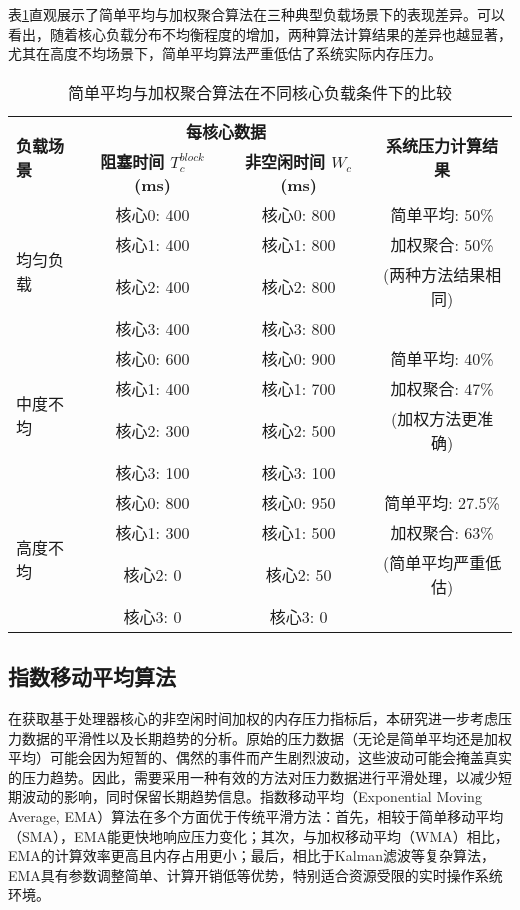 表\ref{tab:weighted_vs_simple}直观展示了简单平均与加权聚合算法在三种典型负载场景下的表现差异。可以看出，随着核心负载分布不均衡程度的增加，两种算法计算结果的差异也越显著，尤其在高度不均场景下，简单平均算法严重低估了系统实际内存压力。

\begin{table}[htbp]
    \centering
    \caption{简单平均与加权聚合算法在不同核心负载条件下的比较}
    \label{tab:weighted_vs_simple}
    \begin{tabular}{lccc}
        \toprule
        \multirow{2}{*}{\textbf{负载场景}} & \multicolumn{2}{c}{\textbf{每核心数据}} & \multirow{2}{*}{\textbf{系统压力计算结果}} \\
        \cmidrule(lr){2-3}
         & \textbf{阻塞时间 $T_c^{block}$ (ms)} & \textbf{非空闲时间 $W_c$ (ms)} & \\
        \midrule
        \multirow{4}{*}{均匀负载} & 核心0: 400 & 核心0: 800 & 简单平均: 50\% \\
         & 核心1: 400 & 核心1: 800 & 加权聚合: 50\% \\
         & 核心2: 400 & 核心2: 800 & (两种方法结果相同) \\
         & 核心3: 400 & 核心3: 800 & \\
        \midrule
        \multirow{4}{*}{中度不均} & 核心0: 600 & 核心0: 900 & 简单平均: 40\% \\
         & 核心1: 400 & 核心1: 700 & 加权聚合: 47\% \\
         & 核心2: 300 & 核心2: 500 & (加权方法更准确) \\
         & 核心3: 100 & 核心3: 100 & \\
        \midrule
        \multirow{4}{*}{高度不均} & 核心0: 800 & 核心0: 950 & 简单平均: 27.5\% \\
         & 核心1: 300 & 核心1: 500 & 加权聚合: 63\% \\
         & 核心2: 0 & 核心2: 50 & (简单平均严重低估) \\
         & 核心3: 0 & 核心3: 0 & \\
        \bottomrule
    \end{tabular}
\end{table}


\subsection{指数移动平均算法}
\label{sec:exponential_smoothing}
在获取基于处理器核心的非空闲时间加权的内存压力指标后，本研究进一步考虑压力数据的平滑性以及长期趋势的分析。原始的压力数据（无论是简单平均还是加权平均）可能会因为短暂的、偶然的事件而产生剧烈波动，这些波动可能会掩盖真实的压力趋势。因此，需要采用一种有效的方法对压力数据进行平滑处理，以减少短期波动的影响，同时保留长期趋势信息。指数移动平均（Exponential Moving Average, EMA）算法在多个方面优于传统平滑方法：首先，相较于简单移动平均（SMA），EMA能更快地响应压力变化；其次，与加权移动平均（WMA）相比，EMA的计算效率更高且内存占用更小；最后，相比于Kalman滤波等复杂算法，EMA具有参数调整简单、计算开销低等优势，特别适合资源受限的实时操作系统环境。


